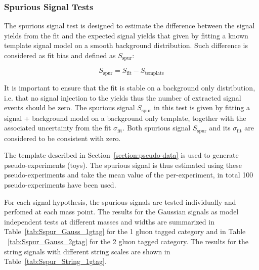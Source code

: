 %
%

\subsubsection{Spurious Signal Tests}

The spurious signal test is designed to estimate the difference between the signal yields from the fit and the expected signal yields that given by fitting a known template signal model on a smooth background distribution. Such difference is considered as fit bias and defined as $S_\mathrm{spur}$:

\begin{equation}
 S_\mathrm{spur} = S_\mathrm{fit} - S_\mathrm{template}
\end{equation}

It is important to ensure that the fit is stable on a background only distribution, i.e. that no signal injection to the yields thus the number of extracted signal events should be zero. The spurious signal $S_\mathrm{spur}$ in this test is given by fitting a signal + background model on a background only template, together with the associated uncertainty from the fit $\sigma_\mathrm{fit}$. Both spurious signal $S_\mathrm{spur}$ and its  $\sigma_\mathrm{fit}$ are considered to be consistent with zero.

The template described in Section~\ref{section:pseudo-data} is used to generate pseudo-experiments (toys). 
The spurious signal is thus estimated using these pseudo-experiments and take the mean value of the per-experiment, in total 100 pseudo-experiments have been used.

For each signal hypothesis, the spurious signals are tested individually and perfomed at each mass point. The results for the Gaussian signals as model independent tests at different masses and widths are summarized in Table~\ref{tab:Sspur_Gauss_1gtag} for the 1 gluon 
tagged category and in Table ~\ref{tab:Sspur_Gauss_2gtag} for the 2 gluon tagged category.
The results for the string signals with different string scales are shown in Table~\ref{tab:Sspur_String_1gtag}. 

